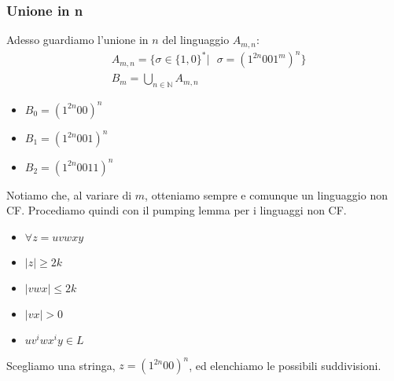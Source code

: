 \documentclass[a4paper,oneside]{scrbook}
\begin{document}
\subsubsection{Unione in n}
Adesso guardiamo l'unione in $n$ del linguaggio $A_{m,n}$:
\begin{align*}
    &A_{m,n}=\{ \sigma \in \{1,0\}^* | \text{ } \sigma = (1^{2n}001^m)^n \}\\
    &B_m = \bigcup_{n\in\mathbb{N}} A_{m,n}
\end{align*}
\begin{itemize}
	\item $B_0=(1^{2n}00)^n$
	\item $B_1=(1^{2n}001)^n$
	\item $B_2=(1^{2n}0011)^n$
\end{itemize}
Notiamo che, al variare di $m$, otteniamo sempre e comunque un linguaggio non CF.
Procediamo quindi con il pumping lemma per i linguaggi non CF.\\
\begin{itemize}
	\item $\forall z = uvwxy$
	\item $|z| \geq 2k$
	\item $|vwx| \leq 2k$
	\item $|vx|>0$
	\item $uv^iwx^iy\in L$
\end{itemize}
Scegliamo una stringa, $z=(1^{2n}00)^n$, ed elenchiamo le possibili suddivisioni.
\end{document}
